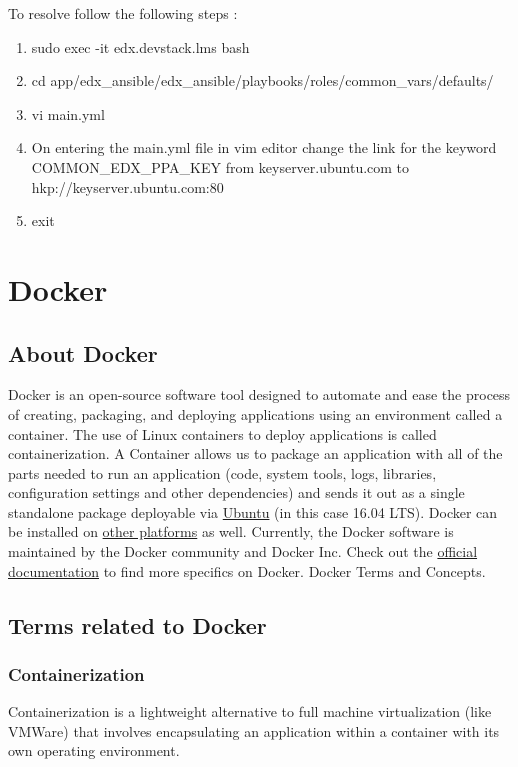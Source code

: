 \documentclass[12pt]{article}
\begin{document}
\begin{enumerate}
		To resolve follow the following steps :
		\begin{enumerate}
			\item sudo exec -it edx.devstack.lms bash
			\item cd app/edx\_ansible/edx\_ansible/playbooks/roles/common\_vars/defaults/
			\item vi main.yml
			\item On entering the main.yml file in vim editor change the link for the keyword 
			COMMON\_EDX\_PPA\_KEY from keyserver.ubuntu.com to  hkp://keyserver.ubuntu.com:80
			\item exit
		\end{enumerate}
	\end{enumerate}
	 
	
\section{Docker \cite{Docker}}
\subsection{About Docker}
Docker is an open-source software tool designed to automate and ease the process of creating, packaging, and deploying applications using an environment called a container. The use of Linux containers to deploy applications is called containerization. A Container allows us to package an application with all of the parts needed to run an application (code, system tools, logs, libraries, configuration settings and other dependencies) and sends it out as a single standalone package deployable via \href{https://goo.gl/f77a2v}{Ubuntu} (in this case 16.04 LTS). Docker can be installed on \href{https://goo.gl/iTES81}{other platforms} as well. Currently, the Docker software is maintained by the Docker community and Docker Inc. Check out the \href{https://docs.docker.com/}{official documentation} to find more specifics on Docker. Docker Terms and Concepts. 
\subsection{Terms related to Docker}
\subsubsection{Containerization}
Containerization is a lightweight alternative to full machine virtualization (like VMWare) that involves encapsulating an application within a container with its own operating environment.
\end{document}
